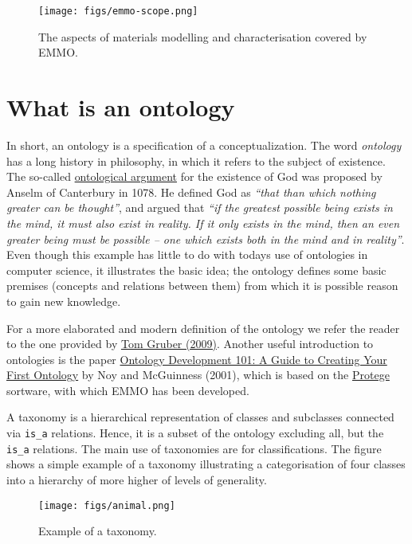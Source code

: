 \documentclass[a4paper,]{report}
\begin{document}
\begin{figure}
\centering
\texttt{[image: figs/emmo-scope.png]}
\caption{The aspects of materials modelling and characterisation covered
by EMMO.}
\end{figure}

\hypertarget{what-is-an-ontology}{%
\section{What is an ontology}\label{what-is-an-ontology}}

In short, an ontology is a specification of a conceptualization. The
word \emph{ontology} has a long history in philosophy, in which it
refers to the subject of existence. The so-called
\href{https://en.wikipedia.org/wiki/Ontological_argument}{ontological
argument} for the existence of God was proposed by Anselm of Canterbury
in 1078. He defined God as \emph{``that than which nothing greater can
be thought''}, and argued that \emph{``if the greatest possible being
exists in the mind, it must also exist in reality. If it only exists in
the mind, then an even greater being must be possible -- one which
exists both in the mind and in reality''}. Even though this example has
little to do with todays use of ontologies in computer science, it
illustrates the basic idea; the ontology defines some basic premises
(concepts and relations between them) from which it is possible reason
to gain new knowledge.

For a more elaborated and modern definition of the ontology we refer the
reader to the one provided by
\href{http://tomgruber.org/writing/ontology-definition-2007.htm}{Tom
Gruber (2009)}. Another useful introduction to ontologies is the paper
\href{http://www.ksl.stanford.edu/people/dlm/papers/ontology-tutorial-noy-mcguinness-abstract.html}{Ontology
Development 101: A Guide to Creating Your First Ontology} by Noy and
McGuinness (2001), which is based on the
\href{https://protege.stanford.edu/}{Protege} sortware, with which EMMO
has been developed.

A taxonomy is a hierarchical representation of classes and subclasses
connected via \texttt{is\_a} relations. Hence, it is a subset of the
ontology excluding all, but the \texttt{is\_a} relations. The main use
of taxonomies are for classifications. The figure shows a simple example
of a taxonomy illustrating a categorisation of four classes into a
hierarchy of more higher of levels of generality.

\begin{figure}
\centering
\texttt{[image: figs/animal.png]}
\caption{Example of a taxonomy.}
\end{figure}
\end{document}
